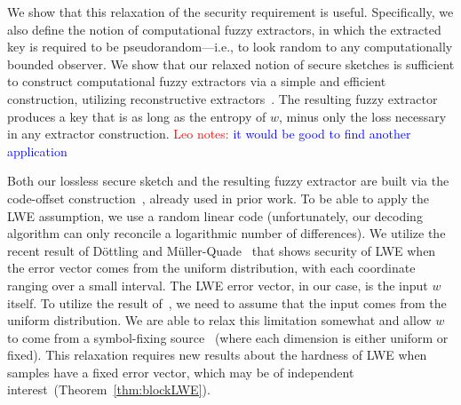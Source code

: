 \documentclass[11pt]{article}
\newcommand{\thref}[1]{\mbox{Theorem~\ref{#1}}}
\newcommand{\authnote}[2]{{\textcolor{red}{\textsf{#1 notes: }\textcolor{blue}{ #2}}\marginpar{\textcolor{red}{\textbf{!!!!!}}}}}
\newcommand{\authnote}[2]{}
\newcommand{\lnote}[1]{{\authnote{Leo}{#1}}}
\begin{document}
We show that this relaxation of the security requirement is  useful.  Specifically, we also define the notion of computational fuzzy extractors, in which the extracted key is required to be pseudorandom---i.e., to look random to any computationally bounded observer.
We show that our relaxed notion of secure sketches is sufficient to construct computational  fuzzy extractors via a simple and efficient construction, utilizing reconstructive extractors~\cite{barak-computational}.  The resulting fuzzy extractor produces a key that is as long as the entropy of $w$, minus only the loss necessary in any extractor construction.
\lnote{it would be good to find another application} 

Both our lossless secure sketch and the resulting fuzzy extractor are built via the code-offset construction~\cite{JW99},\cite[Section 5]{DBLP:journals/siamcomp/DodisORS08} already used in prior work.  To be able to apply the LWE assumption, we use a random linear code (unfortunately, our decoding algorithm can only reconcile a logarithmic number of differences).  We utilize the recent result of D\"{o}ttling and M\"{u}ller-Quade~\cite{dottling2012} that shows security of LWE when the error vector comes from the uniform distribution, with each coordinate ranging over a small interval.  The LWE error vector, in our case, is the input $w$ itself.  To utilize the result of~\cite{dottling2012}, we need to assume that the input comes from the uniform distribution. We are able to relax this limitation somewhat and allow $w$ to come from a symbol-fixing source~\cite{KZ07} (where each dimension is either uniform or fixed). This relaxation requires new results about the hardness of LWE when samples have a fixed error vector, which may be of independent interest~(\thref{thm:blockLWE}).
\end{document}
